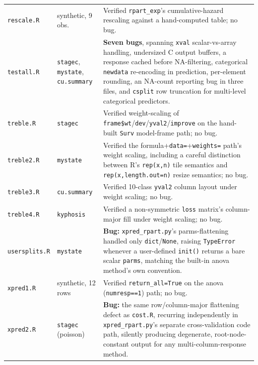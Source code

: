 \documentclass[12pt]{article}
\begin{document}
\begin{longtable}{p{2.1cm}p{2.6cm}p{7.6cm}}
\texttt{rescale.R} & synthetic, 9 obs. & Verified \texttt{rpart\_exp}'s cumulative-hazard rescaling against a hand-computed table; no bug. \\
\texttt{testall.R} & \texttt{stagec}, \texttt{mystate}, \texttt{cu.summary} & \textbf{Seven bugs}, spanning \texttt{xval} scalar-vs-array handling, undersized C output buffers, a response cached before NA-filtering, categorical \texttt{newdata} re-encoding in prediction, per-element rounding, an NA-count reporting bug in three files, and \texttt{csplit} row truncation for multi-level categorical predictors. \\
\texttt{treble.R} & \texttt{stagec} & Verified weight-scaling of \texttt{frame\$wt}/\texttt{dev}/\texttt{yval2}/\texttt{improve} on the hand-built \texttt{Surv} model-frame path; no bug. \\
\texttt{treble2.R} & \texttt{mystate} & Verified the formula+\texttt{data=}+\texttt{weights=} path's weight scaling, including a careful distinction between R's \texttt{rep(x,n)} tile semantics and \texttt{rep(x,length.out=n)} resize semantics; no bug. \\
\texttt{treble3.R} & \texttt{cu.summary} & Verified 10-class \texttt{yval2} column layout under weight scaling; no bug. \\
\texttt{treble4.R} & \texttt{kyphosis} & Verified a non-symmetric \texttt{loss} matrix's column-major fill under weight scaling; no bug. \\
\texttt{usersplits.R} & \texttt{mystate} & \textbf{Bug:} \texttt{xpred\_rpart.py}'s parms-flattening handled only \texttt{dict}/\texttt{None}, raising \texttt{TypeError} whenever a user-defined \texttt{init()} returns a bare scalar \texttt{parms}, matching the built-in anova method's own convention. \\
\texttt{xpred1.R} & synthetic, 12 rows & Verified \texttt{return\_all=True} on the anova (\texttt{numresp==1}) path; no bug. \\
\texttt{xpred2.R} & \texttt{stagec} (poisson) & \textbf{Bug:} the same row/column-major flattening defect as \texttt{cost.R}, recurring independently in \texttt{xpred\_rpart.py}'s separate cross-validation code path, silently producing degenerate, root-node-constant output for any multi-column-response method. \\
\end{longtable}
\end{document}

